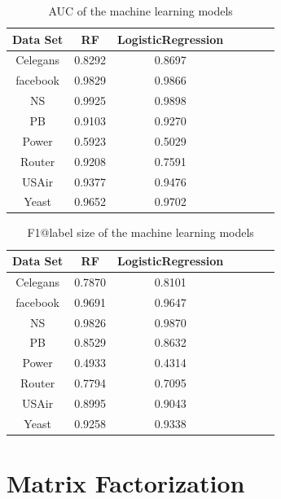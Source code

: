 \documentclass[12pt]{article}
\begin{document}
\begin{table}
	\begin{center}
		\begin{tabular}{|c|c|c|c|c|c|c|}
			\hline
			Data Set & RF & LogisticRegression \\
			\hline
			Celegans&0.8292&0.8697\\
			facebook&0.9829&0.9866\\
			NS&0.9925&0.9898\\
			PB&0.9103&0.9270\\
			Power&0.5923&0.5029\\
			Router&0.9208&0.7591\\
			USAir&0.9377&0.9476\\
			Yeast&0.9652&0.9702\\
			\hline
		\end{tabular}
	\end{center}
	\caption{AUC of the machine learning models}
	\label{tab:ensemble_auc}
\end{table}


\begin{table}
	\begin{center}
		\begin{tabular}{|c|c|c|c|c|c|c|}
			\hline
			Data Set & RF & LogisticRegression \\
			\hline
			Celegans&0.7870&0.8101\\
			facebook&0.9691&0.9647\\
			NS&0.9826&0.9870\\
			PB&0.8529&0.8632\\
			Power&0.4933&0.4314\\
			Router&0.7794&0.7095\\
			USAir&0.8995&0.9043\\
			Yeast&0.9258&0.9338\\
			\hline
		\end{tabular}
	\end{center}
	\caption{F1@label size of the machine learning models}
	\label{tab:ensemble_f1}
\end{table}


\section{Matrix Factorization}
\end{document}
